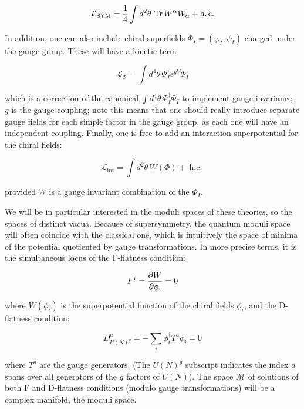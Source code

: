 \begin{equation}
	\mathcal{L}_\mathrm{SYM} = \frac{1}{4} \int d^2 \theta \,\operatorname{Tr} W^\alpha W_\alpha + \operatorname{h.c.}
	\label{}
\end{equation}

In addition, one can also include chiral superfields $\Phi_I = (\varphi_I, \psi_I)$ charged under the gauge group. These will have a kinetic term

\begin{equation}
	\mathcal{L}_\Phi = \int d^4\theta\, \Phi^\dagger_I e^{gV} \Phi_I
	\label{}
\end{equation}

which is a correction of the canonical $\int d^4 \theta \, \Phi^\dagger_I \Phi_I$ to implement gauge invariance. $g$ is the gauge coupling; note this means that one should really introduce separate gauge fields for each simple factor in the gauge group, as each one will have an independent coupling. Finally, one is free to add an interaction superpotential for the chiral fields:

\begin{equation}
	\mathcal{L}_\mathrm{int} = \int d^2 \theta\, W(\Phi) + \operatorname{h.c.}
	\label{}
\end{equation}

provided $W$ is a gauge invariant combination of the $\Phi_I$.

We will be in particular interested in the moduli spaces of these theories, so the spaces of distinct vacua. Because of supersymmetry, the quantum moduli space will often coincide with the classical one, which is intuitively the space of minima of the potential quotiented by gauge transformations. In more precise terms, it is the simultaneous locus of the F-flatness condition:

\begin{equation}
	F^i = \frac{\partial W}{\partial\phi_i} = 0
	\label{}
\end{equation}

where $W(\phi_i)$ is the superpotential function of the chiral fields $\phi_i$, and the D-flatness condition:

\begin{equation}
	D^a_{U(N)^g} = - \sum_i \phi_i^\dagger T^a \phi_i = 0
\end{equation}

where $T^a$ are the gauge generators. (The $U(N)^g$ subscript indicates the index $a$ spans over all generators of the $g$ factors of $U(N)$). The space $\mathcal{M}$ of solutions of both F and D-flatness conditions (modulo gauge transformations) will be a complex manifold, the moduli space.

